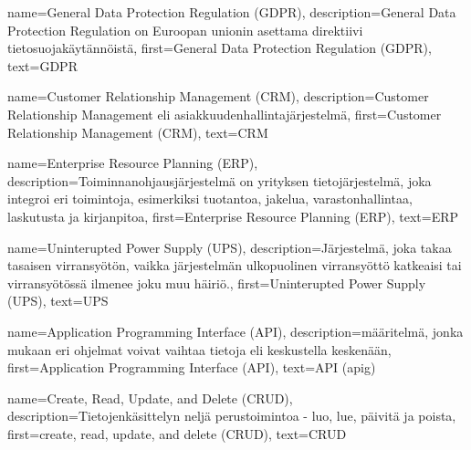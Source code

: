 %
%
%

\makeglossaries



    {
    name={General Data Protection Regulation (GDPR)},
	description={General Data Protection Regulation on Euroopan unionin asettama direktiivi tietosuojakäytännöistä},
	first={General Data Protection Regulation (GDPR)},
	text={GDPR}
    }

    {
	name={Customer Relationship Management (CRM)},
	description={Customer Relationship Management eli asiakkuudenhallintajärjestelmä},
	first={Customer Relationship Management (CRM)},
	text={CRM}
    }

    {
    name={Enterprise Resource Planning (ERP)},
    description={Toiminnanohjausjärjestelmä on yrityksen tietojärjestelmä, joka integroi eri toimintoja, esimerkiksi tuotantoa, jakelua, varastonhallintaa, laskutusta ja kirjanpitoa},
    first={Enterprise Resource Planning (ERP)},
    text={ERP}
    }

    {
    name={Uninterupted Power Supply (UPS)},
    description={Järjestelmä, joka takaa tasaisen virransyötön, vaikka järjestelmän ulkopuolinen virransyöttö katkeaisi tai virransyötössä ilmenee joku muu häiriö.},
    first={Uninterupted Power Supply (UPS)},
    text={UPS}
    }

    {
    name={Application Programming Interface (API)},
    description={määritelmä, jonka mukaan eri ohjelmat voivat vaihtaa tietoja eli keskustella keskenään},
    first={Application Programming Interface (API)},
    text={API}
    }
    \glsadd(apig)

    {
    name={Create, Read, Update, and Delete (CRUD)},
    description={Tietojenkäsittelyn neljä perustoimintoa - luo, lue, päivitä ja poista},
    first={create, read, update, and delete (CRUD)},
    text={CRUD}
    }

